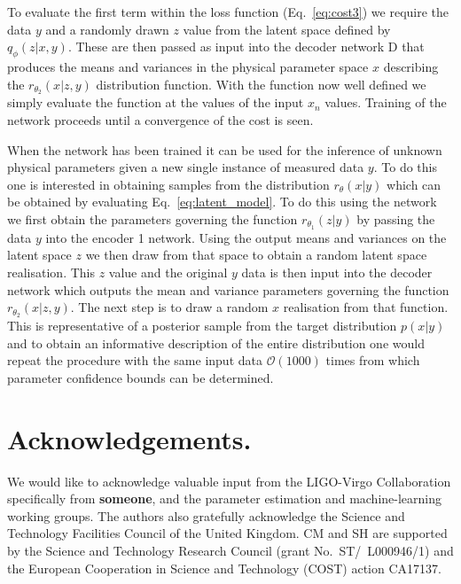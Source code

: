 \documentclass[%
showpacs,
 amsmath,amssymb,
 aps,
 twocolumn,
 prl,
 reprint,
floatfix,
]{revtex4-1}
\begin{document}
To evaluate the first term within the loss function (Eq.~\ref{eq:cost3}) we
require the data $y$ and a randomly drawn $z$ value from the latent space defined
by $q_{\phi}(z|x,y)$. These are then passed as input into the decoder network D
that produces the means and variances in the physical parameter space $x$ describing
the $r_{\theta_{2}}(x|z,y)$ distribution function. With the function now well
defined we simply evaluate the function at the values of the input $x_{n}$
values. Training of the network proceeds until a convergence of the cost is
seen. 

When the network has been trained it can be used for the inference of unknown
physical parameters given a new single instance of measured data $y$. To do
this one is interested in obtaining samples from the distribution
$r_{\theta}(x|y)$ which can be obtained by evaluating
Eq.~\ref{eq:latent_model}. To do this using the network we first obtain the
parameters governing the function $r_{\theta_{1}}(z|y)$ by passing the data $y$
into the encoder 1 network. Using the output means and variances on the latent space
$z$ we then draw from that space to obtain a random latent space realisation.
This $z$ value and the original $y$ data is then input into the decoder network
which outputs the mean and variance parameters governing the function
$r_{\theta_{2}}(x|z,y)$. The next step is to draw a random $x$ realisation from
that function. This is representative of a posterior sample from the target
distribution $p(x|y)$ and to obtain an informative description of the entire
distribution one would repeat the procedure with the same input data
$\mathcal{O}(1000)$ times from which parameter confidence bounds can be
determined.      


%
%
\section{Acknowledgements.}
%
We would like to acknowledge valuable input from the LIGO-Virgo Collaboration
specifically from {\textbf{someone}}, and the parameter estimation and
machine-learning working groups. The authors also gratefully acknowledge the
Science and Technology Facilities Council of the United Kingdom. CM and SH are
supported by the Science and Technology Research Council (grant
No.~ST/~L000946/1) and the European Cooperation in Science and Technology
(COST) action CA17137.




\end{document}
